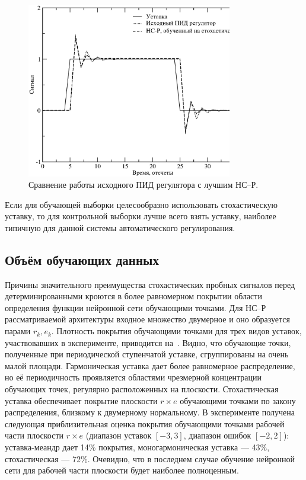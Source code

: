 \begin{figure}
\centering
\includegraphics[width=0.8\textwidth,%
  totalheight=0.35\textheight]{nnc_pid_system_responses_rus}
\caption{Сравнение работы исходного ПИД регулятора с лучшим НС--Р.}%
\label{fig:nnc_pid_system_responses}
\end{figure}

Если для обучающей выборки целесообразно использовать стохастическую
уставку, то для контрольной выборки лучше всего взять уставку,
наиболее типичную для данной системы автоматического регулирования.

\subsection{Объём обучающих данных}

Причины значительного преимущества стохастических пробных сигналов
перед детерминированными кроются в более равномерном покрытии области
определения функции нейронной сети обучающими точками.  Для НС--Р
рассматриваемой архитектуры входное множество двумерное и оно
образуется парами $r_k,e_k$.  Плотность покрытия обучающими точками
для трех видов уставок, участвовавших в эксперименте, приводится
на~.  Видно, что обучающие точки,
полученные при периодической ступенчатой уставке, сгруппированы на
очень малой площади.  Гармоническая уставка дает более равномерное
распределение, но её периодичность проявляется областями чрезмерной
концентрации обучающих точек, регулярно расположенных на плоскости.
Стохастическая уставка обеспечивает покрытие плоскости $r\times e$
обучающими точками по закону распределения, близкому к двумерному
нормальному.  В эксперименте получена следующая приблизительная оценка
покрытия обучающими точками рабочей части плоскости $r\times e$
(диапазон уставок $[-3,3]$, диапазон ошибок $[-2,2]$): уставка-меандр
дает 14\% покрытия, моногармоническая уставка --- 43\%, стохастическая
--- 72\%.  Очевидно, что в последнем случае обучение нейронной сети
для рабочей части плоскости будет наиболее полноценным.

